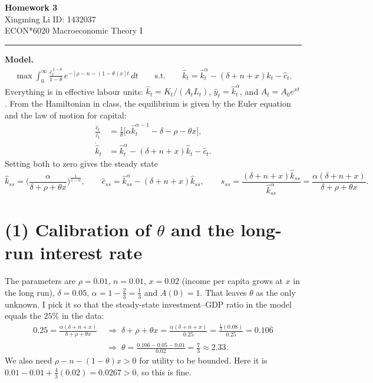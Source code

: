 \documentclass[11pt]{article}
\begin{document}
\begin{center}
{\Large\bfseries Homework 3}\\[0.35em]
{\small Xingming Li \quad ID: 1432037}\\[0.2em]
{\small ECON*6020 Macroeconomic Theory I}
\end{center}

\hrule
\medskip

\textbf{Model.}
\begin{gather*}
\max \int_0^\infty \frac{\hat c_t^{\,1-\theta}}{1-\theta}\, e^{-[\rho-n-(1-\theta)x]t}\,dt
\qquad \text{s.t.} \qquad
\dot{\hat k}_t = \hat k_t^{\alpha} - (\delta+n+x)\hat k_t - \hat c_t .
\end{gather*}
Everything is in effective labour units: $\hat k_t = K_t/(A_tL_t)$, $\hat y_t = \hat k_t^{\alpha}$, and
$A_t = A_0e^{xt}$. From the Hamiltonian in class, the equilibrium is given by the Euler equation and the
law of motion for capital:
\begin{align*}
\frac{\dot{\hat c}_t}{\hat c_t} &= \frac{1}{\theta}\big[\alpha \hat k_t^{\alpha-1} - \delta - \rho - \theta x\big], \\
\dot{\hat k}_t &= \hat k_t^{\alpha} - (\delta+n+x)\hat k_t - \hat c_t .
\end{align*}
Setting both to zero gives the steady state
\[
\hat k_{ss} = \Big(\frac{\alpha}{\delta+\rho+\theta x}\Big)^{\frac{1}{1-\alpha}}, \qquad
\hat c_{ss} = \hat k_{ss}^{\alpha} - (\delta+n+x)\hat k_{ss}, \qquad
s_{ss} = \frac{(\delta+n+x)\hat k_{ss}}{\hat k_{ss}^{\alpha}} = \frac{\alpha(\delta+n+x)}{\delta+\rho+\theta x}.
\]

\section*{(1) Calibration of $\theta$ and the long-run interest rate}

The parameters are $\rho=0.01$, $n=0.01$, $x=0.02$ (income per capita grows at $x$ in the long run),
$\delta=0.05$, $\alpha = 1-\tfrac23 = \tfrac13$ and $A(0)=1$. That leaves $\theta$ as the only unknown.
I pick it so that the steady-state investment--GDP ratio in the model equals the $25\%$ in the data:
\begin{align*}
0.25 = \frac{\alpha(\delta+n+x)}{\delta+\rho+\theta x}
&\;\Longrightarrow\;
\delta+\rho+\theta x = \frac{\alpha(\delta+n+x)}{0.25} = \frac{\tfrac13(0.08)}{0.25} = 0.10\overline{6} \\
&\;\Longrightarrow\;
\theta = \frac{0.10\overline{6} - 0.05 - 0.01}{0.02} = \frac{7}{3} \approx 2.33 .
\end{align*}
We also need $\rho-n-(1-\theta)x>0$ for utility to be bounded. Here it is
$0.01-0.01+\tfrac43(0.02) = 0.0267>0$, so this is fine.
\end{document}

